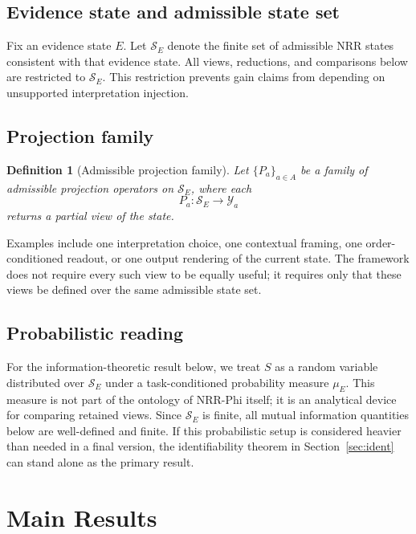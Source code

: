 \documentclass[11pt,a4paper]{article}
\newtheorem{definition}{Definition}
\begin{document}
\subsection{Evidence state and admissible state set}

Fix an evidence state $E$. Let $\mathcal{S}_E$ denote the finite set of admissible NRR states consistent with that evidence state. All views, reductions, and comparisons below are restricted to $\mathcal{S}_E$. This restriction prevents gain claims from depending on unsupported interpretation injection.

\subsection{Projection family}

\begin{definition}[Admissible projection family]
Let $\{P_a\}_{a \in A}$ be a family of admissible projection operators on $\mathcal{S}_E$, where each
\begin{equation}
P_a : \mathcal{S}_E \to \mathcal{Y}_a
\end{equation}
returns a partial view of the state.
\end{definition}

Examples include one interpretation choice, one contextual framing, one order-conditioned readout, or one output rendering of the current state. The framework does not require every such view to be equally useful; it requires only that these views be defined over the same admissible state set.

\subsection{Probabilistic reading}

For the information-theoretic result below, we treat $S$ as a random variable distributed over $\mathcal{S}_E$ under a task-conditioned probability measure $\mu_E$. This measure is not part of the ontology of NRR-Phi \cite{saito2026phi} itself; it is an analytical device for comparing retained views. Since $\mathcal{S}_E$ is finite, all mutual information quantities below are well-defined and finite. If this probabilistic setup is considered heavier than needed in a final version, the identifiability theorem in Section~\ref{sec:ident} can stand alone as the primary result.

\section{Main Results}
\label{sec:results}
\end{document}
